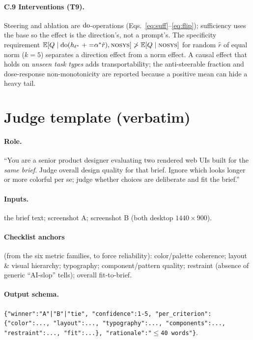 \paragraph{C.9 Interventions (T9).} Steering and ablation are $\operatorname{do}$-operations
(Eqs.~\ref{eq:suff}--\ref{eq:flip}); sufficiency uses the \NOSYS{} base so the effect is the direction's,
not a prompt's. The specificity requirement
$\mathbb{E}[Q\mid\operatorname{do}(h_{\ell^{*}}\mathrel{+}{=}\alpha^{*}\hat r),\textsc{nosys}]\not>\mathbb{E}[Q\mid\textsc{nosys}]$ for
random $\hat r$ of equal norm ($k{=}5$) separates a direction effect from a norm effect. A causal effect
that holds on \emph{unseen task types} adds transportability; the anti-steerable fraction and
dose-response non-monotonicity are reported because a positive mean can hide a heavy tail.

\section{Judge template (verbatim)}
\label{app:judge}

\paragraph{Role.} ``You are a senior product designer evaluating two rendered web UIs built for the
\emph{same brief}. Judge overall design quality for that brief. Ignore which looks longer or more
colorful per se; judge whether choices are deliberate and fit the brief.''

\paragraph{Inputs.} the brief text; screenshot A; screenshot B (both desktop $1440\times900$).

\paragraph{Checklist anchors} (from the six metric families, to force reliability): color/palette
coherence; layout \& visual hierarchy; typography; component/pattern quality; restraint (absence of
generic ``AI-slop'' tells); overall fit-to-brief.

\paragraph{Output schema.}
\texttt{\{"winner":"A"|"B"|"tie", "confidence":1-5, "per\_criterion":\{"color":..., "layout":...,
"typography":..., "components":..., "restraint":..., "fit":...\}, "rationale":"$\le$40 words"\}}.

